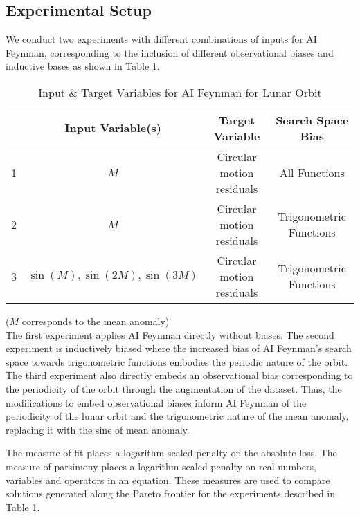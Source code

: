 \documentclass[fleqn,10pt]{olplainarticle}
\numberwithin{equation}{subsection}
\begin{document}
\subsection{Experimental Setup}\label{sec:expSetupLunar}

We conduct two experiments with different combinations of inputs for AI Feynman, corresponding to the inclusion of different observational biases and inductive bases as shown in Table \ref{tab:vartablelunar}.
\begin{table}[H]
    \centering
    \begin{tabular}{|c|c|c|c|}\hline
         &\textbf{Input Variable(s)} & \textbf{Target Variable} & \textbf{Search Space Bias} \\\hline
         1 & $M$ & Circular motion residuals & All Functions \\\hline
         2 & $M$ & Circular motion residuals & Trigonometric Functions \\\hline
         3 & $\sin{(M)}, \sin{(2M)}, \sin{(3M)} $ & Circular motion residuals & Trigonometric Functions \\\hline
    \end{tabular}
    \caption{Input \& Target Variables for AI Feynman for Lunar Orbit}
    \label{tab:vartablelunar}
\end{table}

($M$ corresponds to the mean anomaly)\\

The first experiment applies AI Feynman directly without biases. The second experiment is inductively biased where the increased bias of AI Feynman's search space towards trigonometric functions embodies the periodic nature of the orbit. The third experiment also directly embeds an observational bias corresponding to the periodicity of the orbit through the augmentation of the dataset. Thus, the modifications to embed observational biases inform AI Feynman of the periodicity of the lunar orbit and the trigonometric nature of the mean anomaly, replacing it with the sine of mean anomaly.

The measure of fit places a logarithm-scaled penalty on the absolute loss.
The measure of parsimony places a logarithm-scaled penalty on real numbers,
variables and operators in an equation\cite{Khoo2023.1}. These measures are used to compare solutions generated along the Pareto frontier for the experiments described in Table \ref{tab:vartablelunar}.
\end{document}
